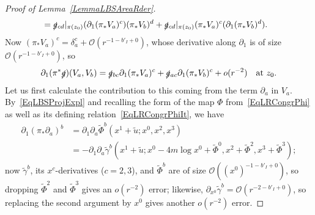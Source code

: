 \documentclass[reqno,11pt,letterpaper]{amsart}
\numberwithin{equation}{section}
\numberwithin{figure}{section}
\theoremstyle{definition}
\theoremstyle{remark}
\newcommand{\mc}{\mathcal}
\newcommand{\cO}{\mc O}
\newcommand{\slg}{\slashed{g}{}}
\newcommand{\pa}{\partial}
\newcommand{\wt}{\widetilde}
\newcommand{\usref}[1]{{\upshape\ref{#1}}}
\begin{document}
\begin{proof}[Proof of Lemma~\usref{LemmaLBSAreaRder}]
\begin{align*}
      &= \slg_{c d}|_{\pi(z_0)}(\pa_1(\pi_*V_a)^c)(\pi_*V_b)^d + \slg_{c d}|_{\pi(z_0)}(\pi_*V_a)^c(\pa_1(\pi_*V_b)^d).
  \end{align*}
  Now $(\pi_*V_a)^c=\delta_a^c+\cO(r^{-1-b'_I+0})$, whose derivative along $\pa_1$ is of size $\cO(r^{-1-b'_I+0})$, so
  \begin{equation}
  \label{EqLBSAreaRderTrslg}
    \pa_1(\pi^*\slg)(V_a,V_b) = \slg_{b c}\pa_1(\pi_*V_a)^c + \slg_{a c}\pa_1(\pi_*V_b)^c + o(r^{-2})\quad\text{at}\ z_0.
  \end{equation}
  Let us first calculate the contribution to this coming from the term $\pa_a$ in $V_a$. By~\eqref{EqLBSProjExpl} and recalling the form of the map $\Phi$ from~\eqref{EqLRCongrPhi} as well as its defining relation~\eqref{EqLRCongrPhiIt}, we have
  \begin{equation}
  \label{EqLBSAreaRderPushfwd}
  \begin{split}
    \pa_1(\pi_*\pa_a)^b &= \pa_1\pa_a\wt\Phi^b(x^1+\wt u; x^0,x^2,x^3) \\
      &= -\pa_1\pa_a\wt\gamma^b(x^1+\wt u;x^0-4 m\log x^0+\wt\Phi^0,x^2+\wt\Phi^2,x^3+\wt\Phi^3);
  \end{split}
  \end{equation}
  now $\wt\gamma^b$, its $x^c$-derivatives ($c=2,3$), and $\wt\Phi^b$ are of size $\cO((x^0)^{-1-b'_I+0})$, so dropping $\wt\Phi^2$ and $\wt\Phi^3$ gives an $o(r^{-2})$ error; likewise, $\pa_{x^0}\wt\gamma^b=\cO(r^{-2-b'_I+0})$, so replacing the second argument by $x^0$ gives another $o(r^{-2})$ error.
  

\end{proof}
\end{document}
